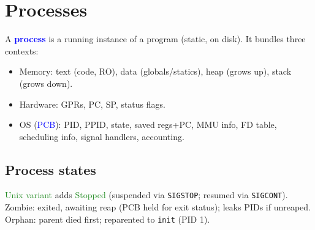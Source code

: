 \section{Processes}
A \textcolor{Blue}{\textbf{process}} is a running instance of a \textcolor{Bittersweet}{program} (static, on disk). It bundles three contexts:
\begin{itemize}
  \item \textcolor{Bittersweet}{Memory}: \textcolor{Bittersweet}{text} (code, RO), \textcolor{Bittersweet}{data} (globals/statics), \textcolor{Bittersweet}{heap} (grows up), \textcolor{Bittersweet}{stack} (grows down).
  \item \textcolor{Bittersweet}{Hardware}: GPRs, \textcolor{Bittersweet}{PC}, \textcolor{Bittersweet}{SP}, status flags.
  \item \textcolor{Bittersweet}{OS} (\textcolor{Blue}{PCB}): PID, PPID, state, saved regs+PC, MMU info, FD table, scheduling info, signal handlers, accounting.
\end{itemize}

\subsection{Process states}
\begin{center}
\end{center}
\textcolor{ForestGreen}{Unix variant} adds \textcolor{ForestGreen}{Stopped} (suspended via \texttt{SIGSTOP}; resumed via \texttt{SIGCONT}).
\textcolor{Bittersweet}{Zombie}: exited, awaiting reap (PCB held for exit status); leaks PIDs if unreaped. \textcolor{Bittersweet}{Orphan}: parent died first; reparented to \texttt{init} (PID 1).

